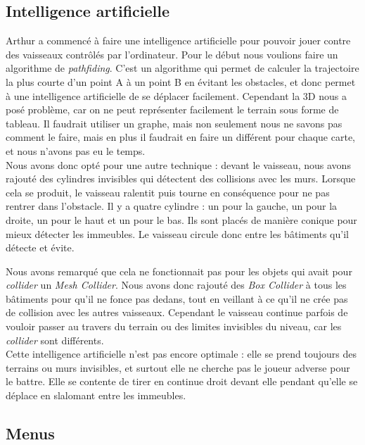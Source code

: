 \documentclass[10pt, titlepage]{report}
\begin{document}
\subsection{Intelligence artificielle}

Arthur a commencé à faire une intelligence artificielle pour pouvoir jouer contre des vaisseaux contrôlés par l'ordinateur. Pour le début nous voulions faire un algorithme de \textit{pathfiding}. C'est un algorithme qui permet de calculer la trajectoire la plus courte d'un point A à un point B en évitant les obstacles, et donc permet à une intelligence artificielle de se déplacer facilement. Cependant la 3D nous a posé problème, car on ne peut représenter facilement le terrain sous forme de tableau. Il faudrait utiliser un graphe, mais non seulement nous ne savons pas comment le faire, mais en plus il faudrait en faire un différent pour chaque carte, et nous n'avons pas eu le temps.\\

Nous avons donc opté pour une autre technique : devant le vaisseau, nous avons rajouté des cylindres invisibles qui détectent des collisions avec les murs. Lorsque cela se produit, le vaisseau ralentit puis tourne en conséquence pour ne pas rentrer dans l'obstacle. Il y a quatre cylindre : un pour la gauche, un pour la droite, un pour le haut et un pour le bas. Ils sont placés de manière conique pour mieux détecter les immeubles. Le vaisseau circule donc entre les bâtiments qu'il détecte et évite.

Nous avons remarqué que cela ne fonctionnait pas pour les objets qui avait pour \textit{collider} un\textit{ Mesh Collider}. Nous avons donc rajouté des \textit{Box Collider} à tous les bâtiments pour qu'il ne fonce pas dedans, tout en veillant à ce qu'il ne crée pas de collision avec les autres vaisseaux. Cependant le vaisseau continue parfois de vouloir passer au travers du terrain ou des limites invisibles du niveau, car les \textit{collider} sont différents.\\

Cette intelligence artificielle n'est pas encore optimale : elle se prend toujours des terrains ou murs invisibles, et surtout elle ne cherche pas le joueur adverse pour le battre. Elle se contente de tirer en continue droit devant elle pendant qu'elle se déplace en slalomant entre les immeubles.\\

\subsection{Menus}
\end{document}

